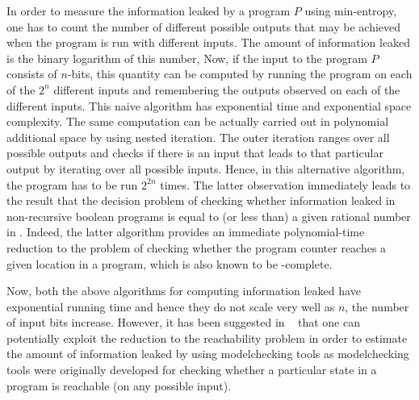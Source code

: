  
 

In order to measure the information leaked by a program $P$ using min-entropy, one has to count the number of different possible outputs that may be achieved when the program is run with different inputs. The amount of information leaked is the binary logarithm of this number, 
Now, if the  input to the program $P$ consists of $n$-bits, this quantity can be computed by running the program on each of the  $2^n$ different inputs and remembering the outputs observed on each of the different inputs. %
This naive algorithm has exponential time and exponential space complexity.  The same computation can be actually carried out in polynomial additional space by using nested iteration.
The outer iteration ranges over  all possible outputs and checks if there is an input that leads to that particular output by iterating over all possible inputs. Hence, in this alternative algorithm, the program has to be run $2^{2n}$ times.  The latter observation  immediately leads to the result that  the decision problem of checking whether information leaked  in non-recursive boolean programs is  equal to (or less than) a given rational number in {\PSpace}. Indeed, the latter algorithm provides an immediate polynomial-time reduction to the problem of checking whether the program counter reaches a given location in a program, which is also known to be {\PSpace}-complete.  


Now, both the above algorithms for computing information leaked have exponential running time and hence they do not scale very well as $n$, the number of input bits increase.  However, it has been suggested in 
~\cite{POST} that one can potentially exploit the  reduction to the reachability problem in order to estimate the amount of information leaked by using modelchecking tools as modelchecking tools were originally developed for checking whether a particular state in a program is reachable (on any possible input).













